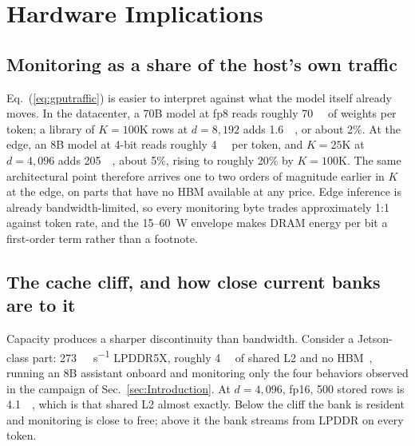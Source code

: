 \section{Hardware Implications}
\label{sec:Hardware}

\subsection{Monitoring as a share of the host's own traffic}
\label{subsec:Tax}
Eq.~(\ref{eq:gputraffic}) is easier to interpret against what the model
itself already moves. In the datacenter, a 70B model at fp8 reads roughly
\qty{70}{\giga\byte} of weights per token; a library of $K=100$K rows at
$d=8{,}192$ adds \qty{1.6}{\giga\byte}, or about 2\%. At the edge, an 8B
model at 4-bit reads roughly \qty{4}{\giga\byte} per token, and $K=25$K
at $d=4{,}096$ adds \qty{205}{\mega\byte}, about 5\%, rising to roughly
20\% by $K=100$K. The same architectural point therefore arrives one to
two orders of magnitude earlier in $K$ at the edge, on parts that have no
HBM available at any price. Edge inference is already bandwidth-limited,
so every monitoring byte trades approximately 1:1 against token rate, and
the 15--\qty{60}{\watt} envelope makes DRAM energy per bit a first-order
term rather than a footnote.

\subsection{The cache cliff, and how close current banks are to it}
\label{subsec:CacheCliff}
Capacity produces a sharper discontinuity than bandwidth. Consider a
Jetson-class part: \qty{273}{\giga\byte\per\second} LPDDR5X, roughly
\qty{4}{\mega\byte} of shared L2 and no HBM~\cite{nvidia_thor}, running
an 8B assistant onboard and monitoring only the four behaviors observed
in the campaign of Sec.~\ref{sec:Introduction}. At $d=4{,}096$, fp16, 500
stored rows is \qty{4.1}{\mega\byte}, which is that shared L2 almost
exactly. Below the cliff the bank is resident and monitoring is close to
free; above it the bank streams from LPDDR on every token.

